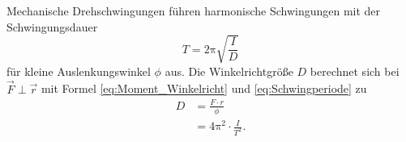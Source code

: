 Mechanische Drehschwingungen führen harmonische Schwingungen mit der Schwingungsdauer
\begin{equation}
	\label{eq:Schwingperiode}
	T=2\mathup{\pi} \sqrt{\frac{I}{D}}
\end{equation}
für kleine Auslenkungswinkel $\phi$ aus. 
Die Winkelrichtgröße $D$ berechnet sich bei $\vec{F}\perp \vec{r}$ mit Formel \eqref{eq:Moment_Winkelricht} und \eqref{eq:Schwingperiode} zu
\begin{align}
	\label{eq:Winkelricht}
	D&=\frac{F\cdot r}{\phi}\\
	 &= 4\mathup{\pi^{2}}\cdot\frac{I}{T^2}. 
\end{align}

